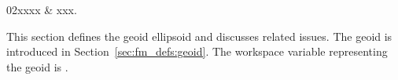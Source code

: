 %
%
 \label{sec:ppath}

%
%
\starthistory
  02xxxx & xxx.\\
\stophistory


%
%
%




\label{sec:ppath:geoids}

This section defines the geoid ellipsoid and discusses related
issues. The geoid is introduced in Section~\ref{sec:fm_defs:geoid}.
The workspace variable representing the geoid is .


